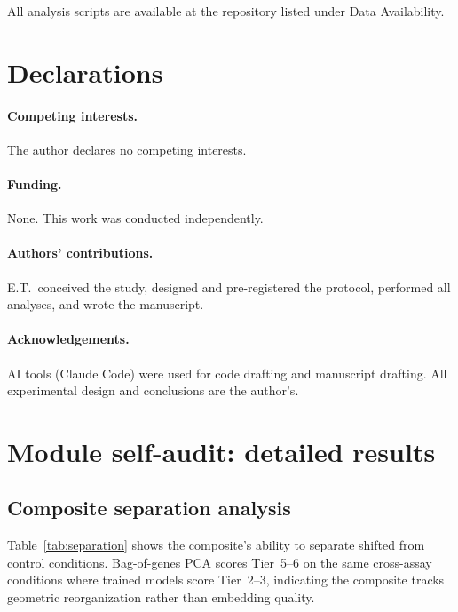 \documentclass[11pt]{article}
\begin{document}
All analysis scripts are available at the repository listed under Data Availability.

\section*{Declarations}

\paragraph{Competing interests.} The author declares no competing interests.

\paragraph{Funding.} None. This work was conducted independently.

\paragraph{Authors' contributions.} E.T.\ conceived the study, designed and pre-registered the protocol, performed all analyses, and wrote the manuscript.

\paragraph{Acknowledgements.} AI tools (Claude Code) were used for code drafting and manuscript drafting. All experimental design and conclusions are the author's.


\appendix

\section{Module self-audit: detailed results}
\label{app:modules}

\subsection{Composite separation analysis}

Table~\ref{tab:separation} shows the composite's ability to separate shifted from control conditions. Bag-of-genes PCA scores Tier~5--6 on the same cross-assay conditions where trained models score Tier~2--3, indicating the composite tracks geometric reorganization rather than embedding quality.
\end{document}
